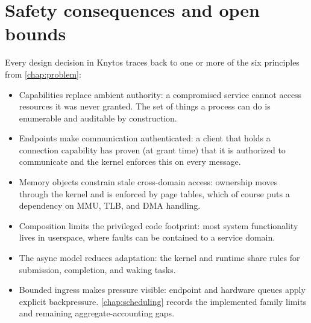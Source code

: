 \section{Safety consequences and open bounds}

Every design decision in Knytos traces back to one or more of the six
principles from \autoref{chap:problem}:

\begin{itemize}
    \item Capabilities replace ambient authority: a compromised service
        cannot access resources it was never granted. The set of things a process
        can do is enumerable and auditable by construction.
    \item Endpoints make communication authenticated: a client that holds
        a connection capability has proven (at grant time) that it is authorized
        to communicate and the kernel enforces this on every message.
    \item Memory objects constrain stale cross-domain access: ownership moves
        through the kernel and is enforced by page tables, which of course puts
        a dependency on MMU, TLB, and DMA handling.
    \item Composition limits the privileged code footprint: most system functionality
        lives in userspace, where faults can be contained to a service domain.
    \item The async model reduces adaptation: the kernel and runtime share
        rules for submission, completion, and waking tasks.
    \item Bounded ingress makes pressure visible: endpoint and hardware queues
        apply explicit backpressure. \autoref{chap:scheduling} records the
        implemented family limits and remaining aggregate-accounting gaps.
\end{itemize}

\endinput
